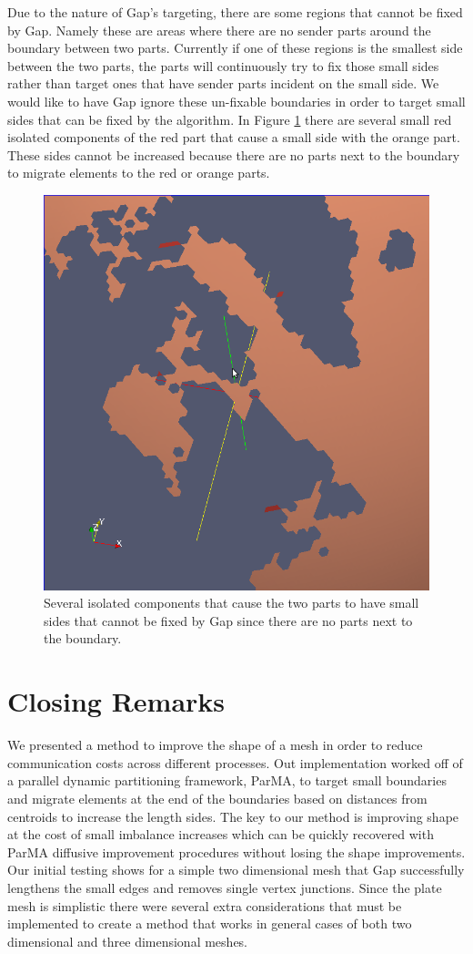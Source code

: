 \documentclass{thesis}
\begin{document}
Due to the nature of Gap's targeting, there are some regions that cannot be 
fixed by Gap. Namely these are areas where there are no sender parts around 
the boundary between two parts. Currently if one of these regions is the 
smallest side between the two parts, the parts will continuously try to fix 
those small sides rather than target ones that have sender parts incident on 
the small side. We would like to have Gap ignore these un-fixable boundaries 
in order to target small sides that can be fixed by the algorithm. In Figure 
\ref{fig:ocean} there are several small red isolated components of the red 
part that cause a small side with the orange part. These sides cannot be 
increased because there are no parts next to the boundary to migrate elements 
to the red or orange parts.

\begin{figure} [!ht]
\centering
\captionsetup{justification=centering,margin=1cm}
\includegraphics[width=.65\textwidth]{Ocean_Isolated.png}
\caption{\label{fig:ocean} \textnormal{Several isolated components that cause the two parts to have small sides that cannot be fixed by Gap since there are no parts next to the boundary.}}
\end{figure}


\chapter{Closing Remarks}

We presented a method to improve the shape of a mesh in order to reduce 
communication costs across different processes. Out implementation worked off of 
a parallel dynamic partitioning framework, ParMA, to target small boundaries 
and migrate elements at the end of the boundaries based on distances from 
centroids to increase the length sides. The key to our method is improving 
shape at the cost of small imbalance increases which can be quickly recovered 
with ParMA diffusive improvement procedures without losing the shape 
improvements. Our initial testing shows for a simple two dimensional mesh that 
Gap successfully lengthens the small edges and removes single vertex junctions. 
Since the plate mesh is 
simplistic there were several extra considerations that must be implemented 
to create a method that works in general cases of both two dimensional and 
three dimensional meshes. 

\endgroup




\end{document}
